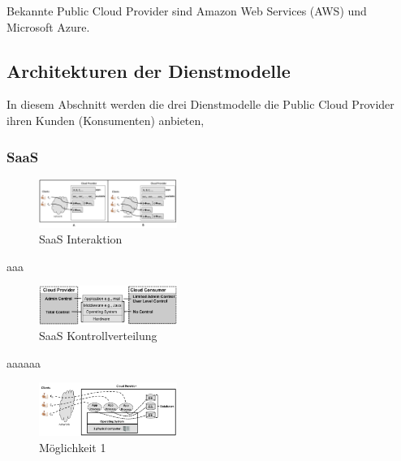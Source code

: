 Bekannte Public Cloud Provider sind Amazon Web Services (AWS) und Microsoft Azure. 



\subsection{Architekturen der Dienstmodelle}

In diesem Abschnitt werden die drei Dienstmodelle die Public Cloud Provider ihren Kunden (Konsumenten) anbieten, 

\subsubsection{SaaS}

\begin{figure}[H]
    \centering
	\includegraphics[width=0.4\textwidth]{Images/SaaSInteraction}
	\caption{SaaS Interaktion \cite{Badger}}
	\label{SaaSInteraction}
\end{figure}


aaa
\begin{figure}[H]
    \centering
	\includegraphics[width=0.4\textwidth]{Images/SaaSControl}
	\caption{SaaS Kontrollverteilung \cite{Badger}}
	\label{SaaSControl}
\end{figure}

aaaaaa
\begin{figure}[H]
    \centering
	\includegraphics[width=0.4\textwidth]{Images/SaaSM1}
	\caption{Möglichkeit 1 \cite{Badger}}
	\label{SaaSM1}
\end{figure}

